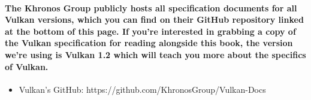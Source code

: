 \paragraph{
The Khronos Group publicly hosts all specification documents for all Vulkan versions, which you can find on their GitHub repository linked at the bottom of this page. If you're interested in grabbing a copy of the Vulkan specification for reading alongside this book, the version we're using is Vulkan 1.2 which will teach you more about the specifics of Vulkan.
}

\begin{itemize}
\itemsep1pt\parskip0pt
\item
  Vulkan's GitHub: https://github.com/KhronosGroup/Vulkan-Docs
\end{itemize}
